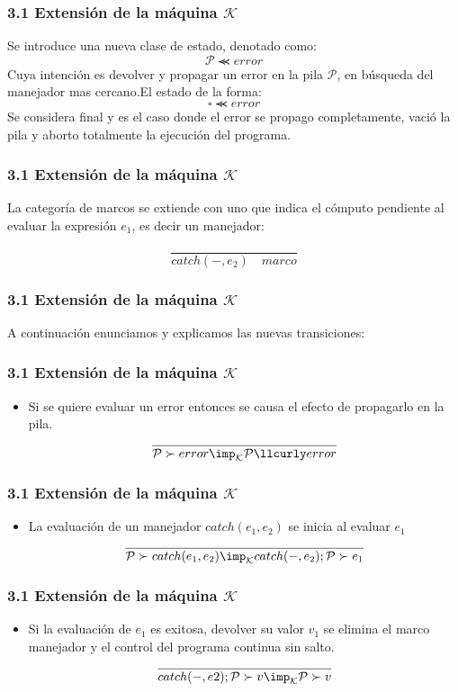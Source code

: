 \documentclass[xcolor=dvipsnames,table,spanish]{beamer}
\begin{document}
\begin{frame}
\frametitle{3.1 Extensión de la máquina $\mathcal{K}$}
Se introduce una nueva clase de estado, denotado como: \[\mathcal{P} \llcurly error\] Cuya intención es devolver y propagar un error en la pila $\mathcal{P}$, en búsqueda del manejador mas cercano.\newline El estado de la forma: \[ \square \llcurly error \] Se considera final y es el caso donde el error se propago completamente, vació la pila y aborto totalmente la ejecución del programa.
\end{frame}

\begin{frame}
\frametitle{3.1 Extensión de la máquina $\mathcal{K}$}
La categoría de marcos se extiende con uno que indica el cómputo pendiente al evaluar la expresión $e_1$, es decir un manejador:

\[\frac{}{catch(-,e_2) \quad marco}\]

\end{frame}

\begin{frame}
\frametitle{3.1 Extensión de la máquina $\mathcal{K}$}
A continuación enunciamos y explicamos las nuevas transiciones:
\end{frame}

\begin{frame}
\frametitle{3.1 Extensión de la máquina $\mathcal{K}$}
\begin{itemize}
		\item Si se quiere evaluar un error entonces se causa el efecto de propagarlo en la pila.
        \[ \frac{}{\mathcal{P} \succ error \imp_{\mathcal{K}}  \mathcal{P} \llcurly error}\]
\end{itemize}
\end{frame}

\begin{frame}
\frametitle{3.1 Extensión de la máquina $\mathcal{K}$}
\begin{itemize}
		\item La evaluación de un manejador $catch(e_1,e_2)$ se inicia al evaluar $e_1$
        \[ \frac{}{\mathcal{P} \succ catch(e_1,e_2) \imp_{\mathcal{K}} catch(-,e_2);\mathcal{P} \succ e_1} \]
\end{itemize}
\end{frame}

\begin{frame}
\frametitle{3.1 Extensión de la máquina $\mathcal{K}$}
\begin{itemize}
		\item Si la evaluación de $e_1$ es exitosa, devolver su valor $v_1$ se elimina el marco manejador y el control del programa continua sin salto.
        \[ \frac{}{catch(-,e2) ; \mathcal{P} \succ v \imp_{\mathcal{K}} \mathcal{P} \succ v} \]
\end{itemize}
\end{frame}
\end{document}

